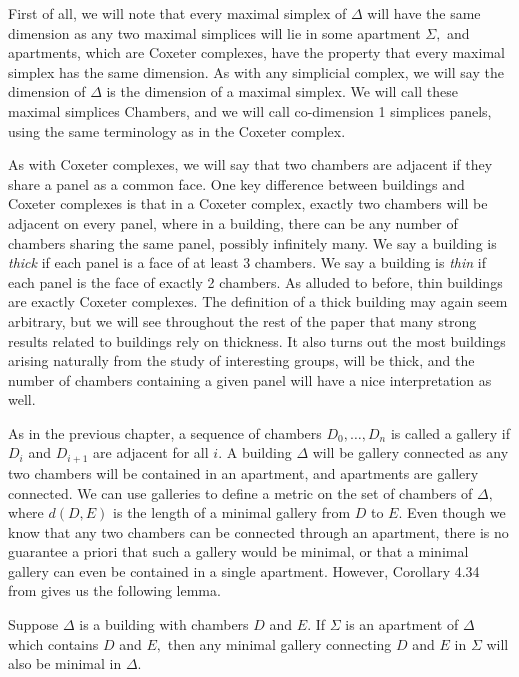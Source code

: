 \documentclass[class=book, crop=false,12 pt]{standalone}
\begin{document}
First of all, we will note that every maximal simplex of $\Delta$ will have the same dimension as any two maximal simplices will lie in some apartment $\Sigma,$ and apartments, which are Coxeter complexes, have the property that every maximal simplex has the same dimension. As with any simplicial complex, we will say the dimension of $\Delta$ is the dimension of a maximal simplex. We will call these maximal simplices Chambers, and we will call co-dimension 1 simplices panels, using the same terminology as in the Coxeter complex.


As with Coxeter complexes, we will say that two chambers are adjacent if they share a panel as a common face. One key difference between buildings and Coxeter complexes is that in a Coxeter complex, exactly two chambers will be adjacent on every panel, where in a building, there can be any number of chambers sharing the same panel, possibly infinitely many. 
We say a building is \emph{thick} if each panel is a face of at least 3 chambers. We say a building is \emph{thin} if each panel is the face of exactly 2 chambers. As alluded to before, thin buildings are exactly Coxeter complexes. The definition of a thick building may again seem arbitrary, but we will see throughout the rest of the paper that many strong results related to buildings rely on thickness. It also turns out the most buildings arising naturally from the study of interesting groups, will be thick, and the number of chambers containing a given panel will have a nice interpretation as well.

As in the previous chapter, a sequence of chambers $D_0,\dots,D_n$ is called a gallery if $D_i$ and $D_{i+1}$ are adjacent for all $i.$ A building $\Delta$ will be gallery connected as any two chambers will be contained in an apartment, and apartments are gallery connected. We can use galleries to define a metric on the set of chambers of $\Delta,$ where $d(D,E)$ is the length of a minimal gallery from $D$ to $E.$ Even though we know that any two chambers can be connected through an apartment, there is no guarantee a priori that such a gallery would be minimal, or that a minimal gallery can even be contained in a single apartment. However, Corollary 4.34 from \cite{buildings} gives us the following lemma.

\begin{lemma}
	\label{lem:dist}
	Suppose $\Delta$ is a building with chambers $D$ and $E.$ If $\Sigma$ is an apartment of $\Delta$ which contains $D$ and $E,$ then any minimal gallery connecting $D$ and $E$ in $\Sigma$ will also be minimal in $\Delta.$
\end{lemma}
\end{document}
